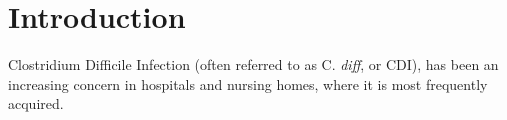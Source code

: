 \chapter{Introduction}

Clostridium Difficile Infection (often referred to as C. \textit{diff}, or CDI), 
has been an increasing concern in hospitals and nursing homes, where it is most frequently acquired.
\cite{Kalton}
\cite{Heeringa}
\cite{Miller}
\cite{Hastie}
\cite{Reinhart}
\cite{Plichta}
\cite{Conover}
\cite{James}
\cite{Boslaugh}

